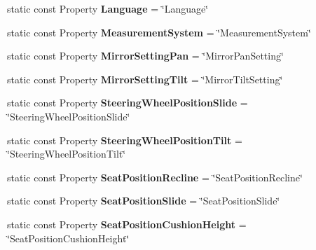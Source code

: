 \begin{DoxyCompactItemize}
\item 
\hypertarget{classVehicleProperty_a715e47aac9daf8a45e34f8379f722c36}{static const Property {\bfseries Language} = \char`\"{}Language\char`\"{}}\label{classVehicleProperty_a715e47aac9daf8a45e34f8379f722c36}

\item 
\hypertarget{classVehicleProperty_a4f252ed33c21bfe8ffab942c765ccd40}{static const Property {\bfseries Measurement\-System} = \char`\"{}Measurement\-System\char`\"{}}\label{classVehicleProperty_a4f252ed33c21bfe8ffab942c765ccd40}

\item 
\hypertarget{classVehicleProperty_ace555610ee0cd0737f2d9b439523666a}{static const Property {\bfseries Mirror\-Setting\-Pan} = \char`\"{}Mirror\-Pan\-Setting\char`\"{}}\label{classVehicleProperty_ace555610ee0cd0737f2d9b439523666a}

\item 
\hypertarget{classVehicleProperty_a2ca932f61b72c5d3d11f0bdcefad8d96}{static const Property {\bfseries Mirror\-Setting\-Tilt} = \char`\"{}Mirror\-Tilt\-Setting\char`\"{}}\label{classVehicleProperty_a2ca932f61b72c5d3d11f0bdcefad8d96}

\item 
\hypertarget{classVehicleProperty_a526cb98dbf809a8affff6785f159f997}{static const Property {\bfseries Steering\-Wheel\-Position\-Slide} = \char`\"{}Steering\-Wheel\-Position\-Slide\char`\"{}}\label{classVehicleProperty_a526cb98dbf809a8affff6785f159f997}

\item 
\hypertarget{classVehicleProperty_aca58b520c35739acd692717c6264381f}{static const Property {\bfseries Steering\-Wheel\-Position\-Tilt} = \char`\"{}Steering\-Wheel\-Position\-Tilt\char`\"{}}\label{classVehicleProperty_aca58b520c35739acd692717c6264381f}

\item 
\hypertarget{classVehicleProperty_a66bbcfc91af9bf11536042b8d1f10134}{static const Property {\bfseries Seat\-Position\-Recline} = \char`\"{}Seat\-Position\-Recline\char`\"{}}\label{classVehicleProperty_a66bbcfc91af9bf11536042b8d1f10134}

\item 
\hypertarget{classVehicleProperty_a005604680e4e58d285f0918ef6212449}{static const Property {\bfseries Seat\-Position\-Slide} = \char`\"{}Seat\-Position\-Slide\char`\"{}}\label{classVehicleProperty_a005604680e4e58d285f0918ef6212449}

\item 
\hypertarget{classVehicleProperty_ab218303d4e45858c16144b33c5d0c6cb}{static const Property {\bfseries Seat\-Position\-Cushion\-Height} = \char`\"{}Seat\-Position\-Cushion\-Height\char`\"{}}\label{classVehicleProperty_ab218303d4e45858c16144b33c5d0c6cb}


\end{DoxyCompactItemize}
